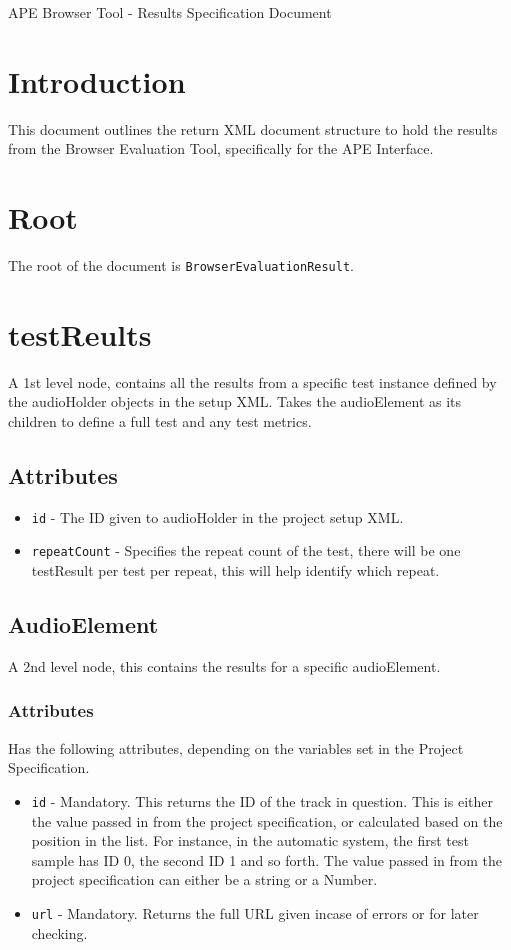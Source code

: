 \documentclass{article}
\begin{document}
\large APE Browser Tool - Results Specification Document

\section{Introduction}
This document outlines the return XML document structure to hold the results from the Browser Evaluation Tool, specifically for the APE Interface.

\section{Root}
The root of the document is \texttt{BrowserEvaluationResult}.

\section{testReults}
A 1st level node, contains all the results from a specific test instance defined by the audioHolder objects in the setup XML. Takes the audioElement as its children to define a full test and any test metrics.

\subsection{Attributes}
\begin{itemize}
\item \texttt{id} - The ID given to audioHolder in the project setup XML.
\item \texttt{repeatCount} - Specifies the repeat count of the test, there will be one testResult per test per repeat, this will help identify which repeat.
\end{itemize}

\subsection{AudioElement}
A 2nd level node, this contains the results for a specific audioElement.

\subsubsection{Attributes}
Has the following attributes, depending on the variables set in the Project Specification.
\begin{itemize}
\item \texttt{id} - Mandatory. This returns the ID of the track in question. This is either the value passed in from the project specification, or calculated based on the position in the list. For instance, in the automatic system, the first test sample has ID 0, the second ID 1 and so forth. The value passed in from the project specification can either be a string or a Number.
\item \texttt{url} - Mandatory. Returns the full URL given incase of errors or for later checking.
\end{itemize}
\end{document}
